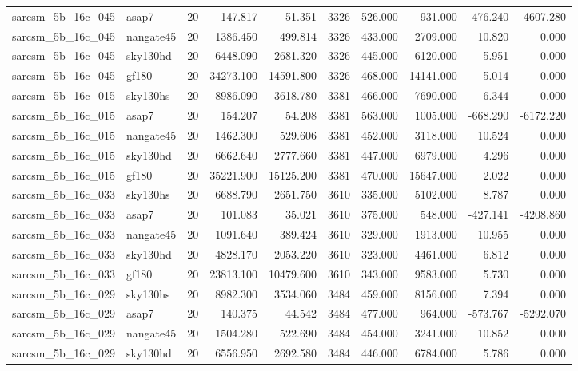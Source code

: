 \documentclass{article}
\begin{document}
\begin{longtable}{llrrrrrrrr}
sarcsm\_5b\_16c\_045 & asap7 & 20 & 147.817 & 51.351 & 3326 & 526.000 & 931.000 & -476.240 & -4607.280 \\
sarcsm\_5b\_16c\_045 & nangate45 & 20 & 1386.450 & 499.814 & 3326 & 433.000 & 2709.000 & 10.820 & 0.000 \\
sarcsm\_5b\_16c\_045 & sky130hd & 20 & 6448.090 & 2681.320 & 3326 & 445.000 & 6120.000 & 5.951 & 0.000 \\
sarcsm\_5b\_16c\_045 & gf180 & 20 & 34273.100 & 14591.800 & 3326 & 468.000 & 14141.000 & 5.014 & 0.000 \\
sarcsm\_5b\_16c\_015 & sky130hs & 20 & 8986.090 & 3618.780 & 3381 & 466.000 & 7690.000 & 6.344 & 0.000 \\
sarcsm\_5b\_16c\_015 & asap7 & 20 & 154.207 & 54.208 & 3381 & 563.000 & 1005.000 & -668.290 & -6172.220 \\
sarcsm\_5b\_16c\_015 & nangate45 & 20 & 1462.300 & 529.606 & 3381 & 452.000 & 3118.000 & 10.524 & 0.000 \\
sarcsm\_5b\_16c\_015 & sky130hd & 20 & 6662.640 & 2777.660 & 3381 & 447.000 & 6979.000 & 4.296 & 0.000 \\
sarcsm\_5b\_16c\_015 & gf180 & 20 & 35221.900 & 15125.200 & 3381 & 470.000 & 15647.000 & 2.022 & 0.000 \\
sarcsm\_5b\_16c\_033 & sky130hs & 20 & 6688.790 & 2651.750 & 3610 & 335.000 & 5102.000 & 8.787 & 0.000 \\
sarcsm\_5b\_16c\_033 & asap7 & 20 & 101.083 & 35.021 & 3610 & 375.000 & 548.000 & -427.141 & -4208.860 \\
sarcsm\_5b\_16c\_033 & nangate45 & 20 & 1091.640 & 389.424 & 3610 & 329.000 & 1913.000 & 10.955 & 0.000 \\
sarcsm\_5b\_16c\_033 & sky130hd & 20 & 4828.170 & 2053.220 & 3610 & 323.000 & 4461.000 & 6.812 & 0.000 \\
sarcsm\_5b\_16c\_033 & gf180 & 20 & 23813.100 & 10479.600 & 3610 & 343.000 & 9583.000 & 5.730 & 0.000 \\
sarcsm\_5b\_16c\_029 & sky130hs & 20 & 8982.300 & 3534.060 & 3484 & 459.000 & 8156.000 & 7.394 & 0.000 \\
sarcsm\_5b\_16c\_029 & asap7 & 20 & 140.375 & 44.542 & 3484 & 477.000 & 964.000 & -573.767 & -5292.070 \\
sarcsm\_5b\_16c\_029 & nangate45 & 20 & 1504.280 & 522.690 & 3484 & 454.000 & 3241.000 & 10.852 & 0.000 \\
sarcsm\_5b\_16c\_029 & sky130hd & 20 & 6556.950 & 2692.580 & 3484 & 446.000 & 6784.000 & 5.786 & 0.000 \\

\end{longtable}
\end{document}
